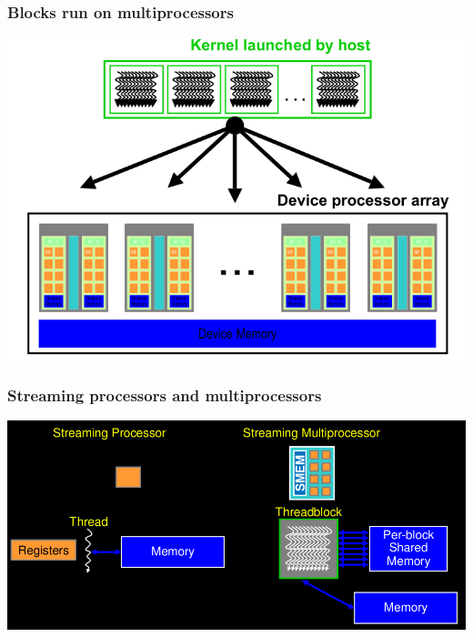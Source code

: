 \begin{frame}[fragile]
\frametitle{Blocks run on multiprocessors}


\begin{center}
\includegraphics[scale=0.5]{images/41.png}
\end{center}
\end{frame}
\begin{frame}[fragile]
\frametitle{Streaming processors and multiprocessors}

\begin{center}
\includegraphics[scale=0.5]{images/S-6.png}
\end{center}
\end{frame}
